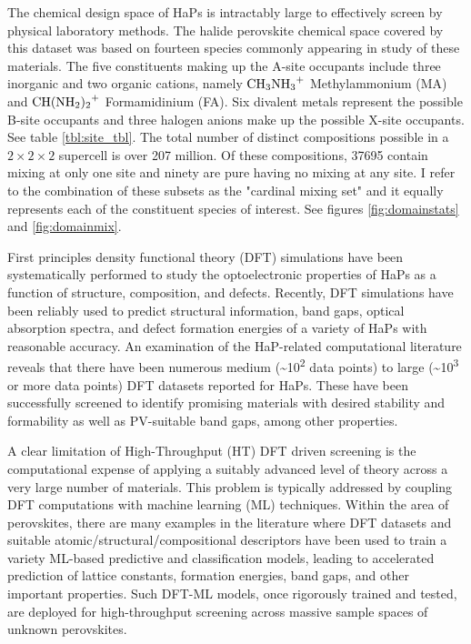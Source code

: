 The chemical design space of HaPs is intractably large to effectively screen by physical laboratory methods.
The halide perovskite chemical space covered by this dataset was based on fourteen species commonly appearing in study of these materials.
The five constituents making up the A-site occupants include three inorganic and two organic cations, namely \(\ce{CH3NH3+}\) Methylammonium (MA) and \(\ce{CH(NH2)2+}\) Formamidinium (FA).
\autocite{yan-2016-defec-physic,dimesso-2016-inves-formam}
Six divalent metals represent the possible B-site occupants and three halogen anions make up the possible X-site occupants.
See table \ref{tbl:site_tbl}.
The total number of distinct compositions possible in a \(2\times{}2\times{}2\) supercell is over 207 million.
Of these compositions, 37695 contain mixing at only one site and ninety are pure having no mixing at any site.
I refer to the combination of these subsets as the "cardinal mixing set" and it equally represents each of the constituent species of interest.
See figures \ref{fig:domainstats} and \ref{fig:domainmix}.

First principles density functional theory (DFT) simulations have been systematically performed to study the optoelectronic properties of HaPs as a function of structure, composition, and defects.
Recently, DFT simulations have been reliably used to predict structural information, band gaps, optical absorption spectra, and defect formation energies of a variety of HaPs with reasonable accuracy.
\autocite{mannodi-kanakkithodi-2022-data-driven,yin-2015-halid-perov}
An examination of the HaP-related computational literature reveals that there have been numerous medium (\textasciitilde{}10\textsuperscript{2} data points) to large (\textasciitilde{}10\textsuperscript{3} or more data points) DFT datasets reported for HaPs.
\autocite{castelli-2014-bandg-calcul,park-2019-explor-new,kar-2018-comput-screen,pu-2021-screen-perov}
These have been successfully screened to identify promising materials with desired stability and formability as well as PV-suitable band gaps, among other properties.

A clear limitation of High-Throughput (HT) DFT driven screening is the computational expense of applying a suitably advanced level of theory across a very large number of materials.
This problem is typically addressed by coupling DFT computations with machine learning (ML) techniques.
Within the area of perovskites, there are many examples in the literature where DFT datasets and suitable atomic/structural/compositional descriptors have been used to train a variety ML-based predictive and classification models, leading to accelerated prediction of lattice constants, formation energies, band gaps, and other important properties.
\autocite{park-2019-explor-new,stanley-2020-machin-learn,lee-2021-discov-lead}
Such DFT-ML models, once rigorously trained and tested, are deployed for high-throughput screening across massive sample spaces of unknown perovskites.
\autocite{yang-2022-high-throug}

